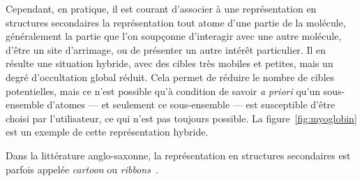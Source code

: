	Cependant, en pratique, il est courant d'associer à une représentation en structures secondaires la représentation \og tout atome \fg{} d'une partie de la molécule, généralement la partie que l'on soupçonne d'interagir avec une autre molécule, d'être un site d'arrimage, ou de présenter un autre intérêt particulier. Il en résulte une situation hybride, avec des cibles très mobiles et petites, mais un degré d'occultation global réduit. Cela permet de réduire le nombre de cibles potentielles, mais ce n'est possible qu'à condition de savoir \emph{a priori} qu'un sous-ensemble d'atomes --- et seulement ce sous-ensemble --- est susceptible d'être choisi par l'utilisateur, ce qui n'est pas toujours possible. La figure~\ref{fig:myoglobin} est un exemple de cette représentation hybride.

	Dans la littérature anglo-saxonne, la représentation en structures secondaires est parfois appelée \emph{cartoon} ou \emph{ribbons}~\cite{carson1986algorithm, richardson2000early}.
	
